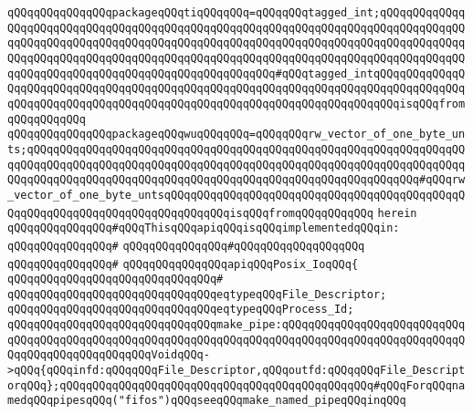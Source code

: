 \verb|qQQqqQQqqQQqqQQqpackageqQQqtiqQQqqQQq=qQQqqQQqtagged_int;qQQqqQQqqQQqqQQqqQQqqQQqqQQqqQQqqQQqqQQqqQQqqQQqqQQqqQQqqQQqqQQqqQQqqQQqqQQqqQQqqQQqqQQqqQQqqQQqqQQqqQQqqQQqqQQqqQQqqQQqqQQqqQQqqQQqqQQqqQQqqQQqqQQqqQQqqQQqqQQqqQQqqQQqqQQqqQQqqQQqqQQqqQQqqQQqqQQqqQQqqQQqqQQqqQQqqQQqqQQqqQQqqQQqqQQqqQQqqQQqqQQqqQQqqQQqqQQqqQQqqQQq#qQQqtagged_intqQQqqQQqqQQqqQQqqQQqqQQqqQQqqQQqqQQqqQQqqQQqqQQqqQQqqQQqqQQqqQQqqQQqqQQqqQQqqQQqqQQqqQQqqQQqqQQqqQQqqQQqqQQqqQQqqQQqqQQqqQQqqQQqqQQqqQQqqQQqqQQqisqQQqfromqQQqqQQqqQQq|\newline
\verb|qQQqqQQqqQQqqQQqpackageqQQqwuqQQqqQQq=qQQqqQQqrw_vector_of_one_byte_unts;qQQqqQQqqQQqqQQqqQQqqQQqqQQqqQQqqQQqqQQqqQQqqQQqqQQqqQQqqQQqqQQqqQQqqQQqqQQqqQQqqQQqqQQqqQQqqQQqqQQqqQQqqQQqqQQqqQQqqQQqqQQqqQQqqQQqqQQqqQQqqQQqqQQqqQQqqQQqqQQqqQQqqQQqqQQqqQQqqQQqqQQqqQQqqQQqqQQqqQQq#qQQqrw_vector_of_one_byte_untsqQQqqQQqqQQqqQQqqQQqqQQqqQQqqQQqqQQqqQQqqQQqqQQqqQQqqQQqqQQqqQQqqQQqqQQqqQQqqQQqisqQQqfromqQQqqQQqqQQq|\newline
\verb|herein|\newline
\newline
\verb|qQQqqQQqqQQqqQQq#qQQqThisqQQqapiqQQqisqQQqimplementedqQQqin:|\newline
\verb|qQQqqQQqqQQqqQQq#|\newline
\verb|qQQqqQQqqQQqqQQq#qQQqqQQqqQQqqQQqqQQq|\newline
\verb|qQQqqQQqqQQqqQQq#|\newline
\verb|qQQqqQQqqQQqqQQqapiqQQqPosix_IoqQQq{|\newline
\verb|qQQqqQQqqQQqqQQqqQQqqQQqqQQqqQQq#|\newline
\verb|qQQqqQQqqQQqqQQqqQQqqQQqqQQqqQQqeqtypeqQQqFile_Descriptor;|\newline
\verb|qQQqqQQqqQQqqQQqqQQqqQQqqQQqqQQqeqtypeqQQqProcess_Id;|\newline
\newline
\verb|qQQqqQQqqQQqqQQqqQQqqQQqqQQqqQQqmake_pipe:qQQqqQQqqQQqqQQqqQQqqQQqqQQqqQQqqQQqqQQqqQQqqQQqqQQqqQQqqQQqqQQqqQQqqQQqqQQqqQQqqQQqqQQqqQQqqQQqqQQqqQQqqQQqqQQqqQQqqQQqVoidqQQq->qQQq{qQQqinfd:qQQqqQQqFile_Descriptor,qQQqoutfd:qQQqqQQqFile_DescriptorqQQq};qQQqqQQqqQQqqQQqqQQqqQQqqQQqqQQqqQQqqQQqqQQqqQQq#qQQqForqQQqnamedqQQqpipesqQQq("fifos")qQQqseeqQQqmake_named_pipeqQQqinqQQq|\newline
